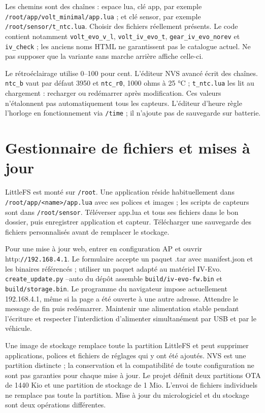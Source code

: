 Les chemins sont des chaînes : espace lua, clé app, par exemple \nolinkurl{/root/app/volt_minimal/app.lua} ; et clé sensor, par exemple \nolinkurl{/root/sensor/t_ntc.lua}. Choisir des fichiers réellement présents. Le code contient notamment \nolinkurl{volt_evo_v_l}, \nolinkurl{volt_iv_evo_t}, \nolinkurl{gear_iv_evo_norev} et \nolinkurl{iv_check} ; les anciens noms HTML ne garantissent pas le catalogue actuel. Ne pas supposer que la variante sans marche arrière affiche celle-ci.

Le rétroéclairage utilise 0–100 pour cent. L'éditeur NVS avancé écrit des chaînes. \nolinkurl{ntc_b} vaut par défaut 3950 et \nolinkurl{ntc_r0}, 1000 ohms à 25 °C ; \nolinkurl{t_ntc.lua} les lit au chargement : recharger ou redémarrer après modification. Ces valeurs n'étalonnent pas automatiquement tous les capteurs. L'éditeur d'heure règle l'horloge en fonctionnement via \nolinkurl{/time} ; il n'ajoute pas de sauvegarde sur batterie.

\section{Gestionnaire de fichiers et mises à jour}
LittleFS est monté sur \nolinkurl{/root}. Une application réside habituellement dans \nolinkurl{/root/app/<name>/app.lua} avec ses polices et images ; les scripts de capteurs sont dans \nolinkurl{/root/sensor}. Téléverser app.lua et tous ses fichiers dans le bon dossier, puis enregistrer application et capteur. Télécharger une sauvegarde des fichiers personnalisés avant de remplacer le stockage.

Pour une mise à jour web, entrer en configuration AP et ouvrir http:\nolinkurl{//192.168.4.1}. Le formulaire accepte un paquet .tar avec manifest.json et les binaires référencés ; utiliser un paquet adapté au matériel IV-Evo. \nolinkurl{create_update.py} --auto du dépôt assemble \nolinkurl{build/iv-evo-fw.bin} et \nolinkurl{build/storage.bin}. Le programme du navigateur impose actuellement 192.168.4.1, même si la page a été ouverte à une autre adresse. Attendre le message de fin puis redémarrer. Maintenir une alimentation stable pendant l'écriture et respecter l'interdiction d'alimenter simultanément par USB et par le véhicule.

Une image de stockage remplace toute la partition LittleFS et peut supprimer applications, polices et fichiers de réglages qui y ont été ajoutés. NVS est une partition distincte ; la conservation et la compatibilité de toute configuration ne sont pas garanties pour chaque mise à jour. Le projet définit deux partitions OTA de 1440 Kio et une partition de stockage de 1 Mio. L'envoi de fichiers individuels ne remplace pas toute la partition. Mise à jour du micrologiciel et du stockage sont deux opérations différentes.

